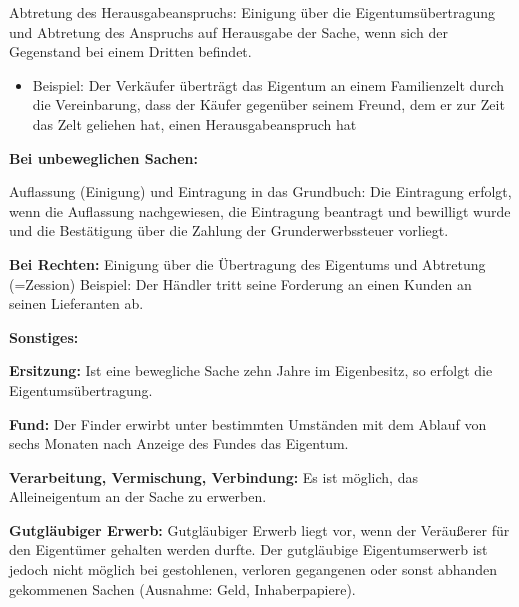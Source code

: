 \documentclass[10pt]{article}
\begin{document}
Abtretung des Herausgabeanspruchs: 
Einigung über die Eigentumsübertragung und Abtretung des Anspruchs auf Herausgabe der Sache, wenn sich der Gegenstand bei einem Dritten befindet.
\begin{itemize}
    \item Beispiel: Der Verkäufer überträgt das Eigentum an einem Familienzelt durch die Vereinbarung, dass der Käufer gegenüber seinem Freund, dem er zur Zeit das Zelt geliehen hat, einen Herausgabeanspruch hat
\end{itemize}

\textbf{Bei unbeweglichen Sachen:}

Auflassung (Einigung) und Eintragung in das Grundbuch: 
Die Eintragung erfolgt, wenn die Auflassung nachgewiesen, die Eintragung beantragt und bewilligt wurde und die Bestätigung über die Zahlung der Grunderwerbssteuer vorliegt.

\textbf{Bei Rechten:}
Einigung über die Übertragung des Eigentums und Abtretung (=Zession)
Beispiel: Der Händler tritt seine Forderung an einen Kunden an seinen Lieferanten ab.

\textbf{Sonstiges:}

\textbf{Ersitzung:} 
Ist eine bewegliche Sache zehn Jahre im Eigenbesitz, so erfolgt die Eigentumsübertragung.

\textbf{Fund:}
Der Finder erwirbt unter bestimmten Umständen mit dem Ablauf von sechs Monaten nach Anzeige des Fundes das Eigentum.

\textbf{Verarbeitung, Vermischung, Verbindung:}
Es ist möglich, das Alleineigentum an der Sache zu erwerben.

\textbf{Gutgläubiger Erwerb:}
Gutgläubiger Erwerb liegt vor, wenn der Veräußerer für den Eigentümer gehalten werden durfte. Der gutgläubige Eigentumserwerb ist jedoch nicht möglich bei gestohlenen, verloren gegangenen oder
sonst abhanden gekommenen Sachen (Ausnahme: Geld, Inhaberpapiere).
\end{document}

